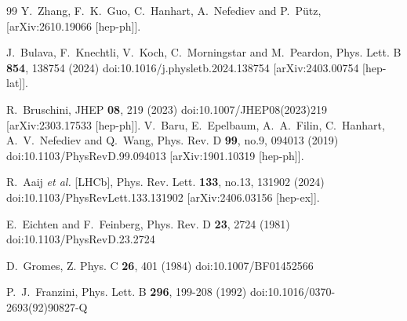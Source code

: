 \documentclass[aps,prl,showpacs,amsmath,onecolumn,superscriptaddress,floatfix,nofootinbib,notitlepage]{revtex4-2}
\begin{document}
\begin{thebibliography}{99}
	Y.~Zhang, F.~K.~Guo, C.~Hanhart, A.~Nefediev and P.~P{\"u}tz,
		[arXiv:2610.19066 [hep-ph]].

	J.~Bulava, F.~Knechtli, V.~Koch, C.~Morningstar and M.~Peardon,
	Phys. Lett. B \textbf{854}, 138754 (2024)
	doi:10.1016/j.physletb.2024.138754
		[arXiv:2403.00754 [hep-lat]].

	R.~Bruschini,
	JHEP \textbf{08}, 219 (2023)
	doi:10.1007/JHEP08(2023)219
		[arXiv:2303.17533 [hep-ph]].
	V.~Baru, E.~Epelbaum, A.~A.~Filin, C.~Hanhart, A.~V.~Nefediev and Q.~Wang,
	Phys. Rev. D \textbf{99}, no.9, 094013 (2019)
	doi:10.1103/PhysRevD.99.094013
		[arXiv:1901.10319 [hep-ph]].

	R.~Aaij \textit{et al.} [LHCb],
	Phys. Rev. Lett. \textbf{133}, no.13, 131902 (2024)
	doi:10.1103/PhysRevLett.133.131902
		[arXiv:2406.03156 [hep-ex]].

	E.~Eichten and F.~Feinberg,
	Phys. Rev. D \textbf{23}, 2724 (1981)
	doi:10.1103/PhysRevD.23.2724

	D.~Gromes,
	Z. Phys. C \textbf{26}, 401 (1984)
	doi:10.1007/BF01452566

	P.~J.~Franzini,
	Phys. Lett. B \textbf{296}, 199-208 (1992)
	doi:10.1016/0370-2693(92)90827-Q

\end{thebibliography}
\end{document}

